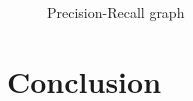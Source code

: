 \documentclass[journal,conference]{IEEEtran}
\begin{document}
\begin{figure}[htbp]
  \centering
  \caption{Precision-Recall graph}\label{fig:res}
\end{figure}

\section{Conclusion}






\end{document}
